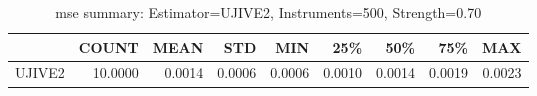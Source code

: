 \begin{table}[ht]
\centering
\caption{mse summary: Estimator=UJIVE2, Instruments=500, Strength=0.70}
\begin{tabular}{lrrrrrrrr}
\toprule
 & COUNT & MEAN & STD & MIN & 25\% & 50\% & 75\% & MAX \\
\midrule
UJIVE2 & 10.0000 & 0.0014 & 0.0006 & 0.0006 & 0.0010 & 0.0014 & 0.0019 & 0.0023 \\
\bottomrule
\end{tabular}
\end{table}
